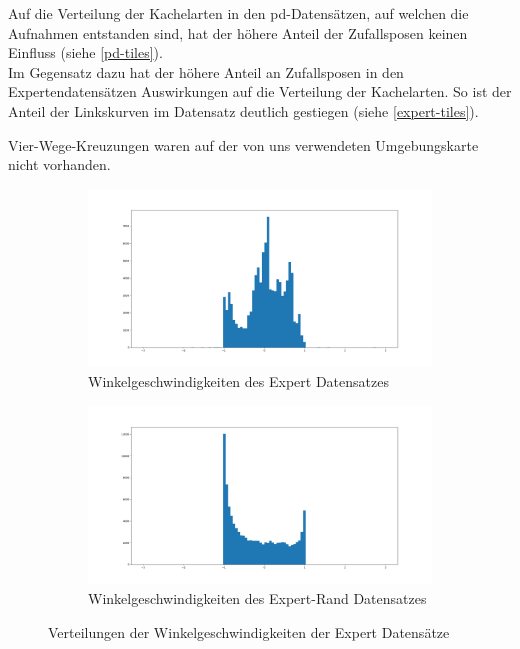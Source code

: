 Auf die Verteilung der Kachelarten in den \acs{pd}-Datensätzen, auf welchen die Aufnahmen entstanden sind, hat der höhere Anteil der Zufallsposen keinen Einfluss (siehe \ref{pd-tiles}).\\
Im Gegensatz dazu hat der höhere Anteil an Zufallsposen in den Expertendatensätzen Auswirkungen auf die Verteilung der Kachelarten. So ist der Anteil der Linkskurven im Datensatz deutlich gestiegen (siehe \ref{expert-tiles}).

Vier-Wege-Kreuzungen waren auf der von uns verwendeten Umgebungskarte nicht vorhanden.

\begin{figure}[H]
	\centering
	\begin{subfigure}{0.5\textwidth}
		\centering
		\includegraphics[width=\linewidth]{kapitel4/images/plots/expert-angular_velocities.png}
		\caption{Winkelgeschwindigkeiten des Expert Datensatzes}
		\label{expert-angular}
	\end{subfigure}%
	\begin{subfigure}{0.5\textwidth}
		\centering
		\includegraphics[width=\linewidth]{kapitel4/images/plots/expert-random-angular_velocities.png}
		\caption{Winkelgeschwindigkeiten des Expert-Rand Datensatzes}
		\label{expert-rand-angular}
	\end{subfigure}
	\caption{Verteilungen der Winkelgeschwindigkeiten der Expert Datensätze}
	\label{expert-angles}
\end{figure}


